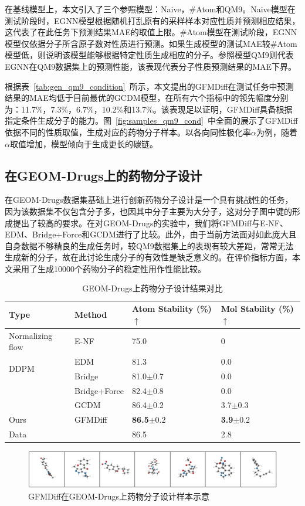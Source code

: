 在基线模型上，本文引入了三个参照模型：Naive，\#Atom和QM9。Naive模型在测试阶段时，EGNN模型根据随机打乱原有的采样样本对应性质并预测相应结果，这代表了在此任务下预测结果MAE的取值上限。\#Atom模型在测试阶段，EGNN模型仅依据分子所含原子数对性质进行预测。如果生成模型的测试MAE较\#Atom模型低，则说明该模型能够根据特定性质生成相应的分子。参照模型QM9则代表EGNN在QM9数据集上的预测性能，该表现代表分子性质预测结果的MAE下界。

根据表~\ref{tab:gen_qm9_condition}~所示，本文提出的GFMDiff在测试任务中预测结果的MAE均低于目前最优的GCDM模型，在所有六个指标中的领先幅度分别为：11.7\%，7.3\%，6.7\%，10.2\%和13.7\%。该表现足以证明，GFMDiff具备根据指定条件生成分子的能力。图~\ref{fig:samples_qm9_cond}~中全面的展示了GFMDiff依据不同的性质取值，生成对应的药物分子样本。以各向同性极化率$\alpha$为例，随着$\alpha$取值增加，模型倾向于生成更长的碳链。

\subsection{在GEOM-Drugs上的药物分子设计}
在GEOM-Drugs数据集基础上进行创新药物分子设计是一个具有挑战性的任务，因为该数据集不仅包含分子多，也因其中分子主要为大分子，这对分子图中键的形成提出了较高的要求。在对GEOM-Drugs的实验中，我们将GFMDiff与E-NF、EDM、Bridge+Force和GCDM进行了比较。此外，由于当前方法面对如此庞大且自身数据不够精良的生成任务时，较QM9数据集上的表现有较大差距，常常无法生成新的分子，故在此讨论生成分子的有效性是缺乏意义的。在评价指标方面，本文采用了生成10000个药物分子的稳定性用作性能比较。

\begin{table}[h]
    \centering
    \caption{GEOM-Drugs上药物分子设计结果对比}
    \label{tab:gen_drugs}
    \begin{tabular}{llll}
    \toprule
    Type & Method & Atom Stability (\%) $\uparrow$ & Mol Stability (\%) $\uparrow$ \\
    \midrule
    Normalizing flow & E-NF & 75.0 & 0 \\
    \multirow{2}{*}{DDPM}
    & EDM  & 81.3 & 0.0 \\
    & Bridge & 81.0$\pm$0.7 & 0.0 \\
    & Bridge+Force & 82.4$\pm$0.8 & 0.0 \\
    & GCDM & 86.4$\pm$0.2 & 3.7$\pm$0.3 \\
    \midrule
    Ours & GFMDiff & \textbf{86.5}$\pm$0.2 & \textbf{3.9}$\pm$0.2 \\
    \midrule
    Data &  & 86.5 & 2.8 \\
    \bottomrule
    \end{tabular}
\end{table}
\begin{figure}[h]
    \centering
    \includegraphics[width=\linewidth]{figures/samples_drugs.png}
    \caption{GFMDiff在GEOM-Drugs上药物分子设计样本示意}
    \label{fig:samples_drugs}
\end{figure}

